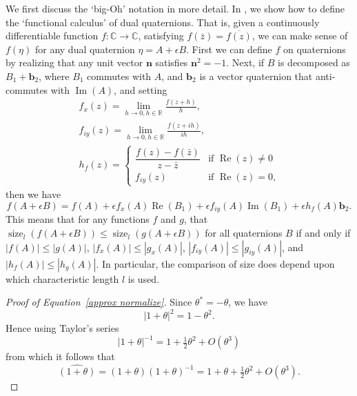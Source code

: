 \documentclass[reqno,12pt]{amsart}
\DeclareMathOperator\realpart{Re}
\DeclareMathOperator\imagpart{Im}
\DeclareMathOperator\size{{size}}
\begin{document}
We first discuss the `big-Oh' notation in more detail.  In \cite{montgomery-smith-functional-calculus}, we show how to define the `functional calculus' of dual quaternions.  That is, given a continuously differentiable function $f:\mathbb C \to \mathbb C$, satisfying $f(\bar z) = \overline{f(z)}$, we can make sense of $f(\eta)$ for any dual quaternion $\eta = A + \epsilon B$.  First we can define $f$ on quaternions by realizing that any unit vector $\bm n$ satisfies $\bm n^2 = -1$.  Next, if $B$ is decomposed as $B_1 + \bm b_2$, where $B_1$ commutes with $A$, and $\bm b_2$ is a vector quaternion that anti-commutes with $\imagpart(A)$, and setting
\begin{gather}
f_x(z) = \lim_{h \to 0, h \in \mathbb R} \frac{f(z+h)} h , \\
f_{iy}(z) = \lim_{h \to 0, h \in \mathbb R} \frac{f(z+ih)} {ih} , \\
h_f(z) = \begin{cases}\dfrac{f(z) - f(\bar z)}{z - \bar z} & \text{if $\realpart(z) \ne 0$} \\
f_{iy}(z) & \text{if $\realpart(z) = 0$,} \end{cases}
\end{gather}
then we have
\begin{equation}
f(A + \epsilon B) = f(A) + \epsilon f_x(A) \realpart(B_1) + \epsilon f_{iy}(A) \imagpart(B_1) + \epsilon h_f(A) \bm b_2.
\end{equation}
This means that for any functions $f$ and $g$, that $\size_l(f(A + \epsilon B)) \le \size_l(g(A + \epsilon B))$ for all quaternions $B$ if and only if $|f(A)| \le |g(A)|$, $|f_x(A)| \le |g_x(A)|$, $|f_{iy}(A)| \le |g_{iy}(A)|$, and $|h_f(A)| \le |h_g(A)|$.  In particular, the comparison of size does depend upon which characteristic length $l$ is used.

\begin{proof}[Proof of Equation~\eqref{approx normalize}]  Since $\theta^* = -\theta$, we have
\begin{equation}
|1+\theta|^2 = 1 - \theta^2.
\end{equation}
Hence using Taylor's series
\begin{equation}
|1+\theta|^{-1} = 1 + \tfrac12 \theta^2 + O(\theta^3)
\end{equation}
from which it follows that
\begin{equation}
\widehat{(1+\theta)} = (1+\theta)(1+\theta)^{-1} = 1 + \theta + \tfrac12 \theta^2 + O(\theta^3)  .
\end{equation}
\end{proof}
\end{document}

